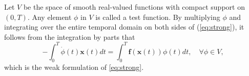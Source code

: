 \documentclass[final]{siamltex}
\newcommand{\bfa}[1]{\boldsymbol{#1}}
\begin{document}
Let $V$ be the space of smooth real-valued functions with compact support on $(0,T)$. Any element $\phi$ in $V$ is called a test function. 
By multiplying $\phi$ and integrating over the entire temporal domain on both sides of (\ref{eq:strong}), it follows from the integration by parts that 
\begin{equation}
\label{eq:weak}
-\int_0^T  \dot{\phi}(t) \bfa{x}(t) dt = \int_0^T \bfa{f}(\bfa{x}(t)) \phi(t) dt, \quad \forall \phi \in V,
\end{equation}
which is the weak formulation of \eqref{eq:strong}.
\end{document}

